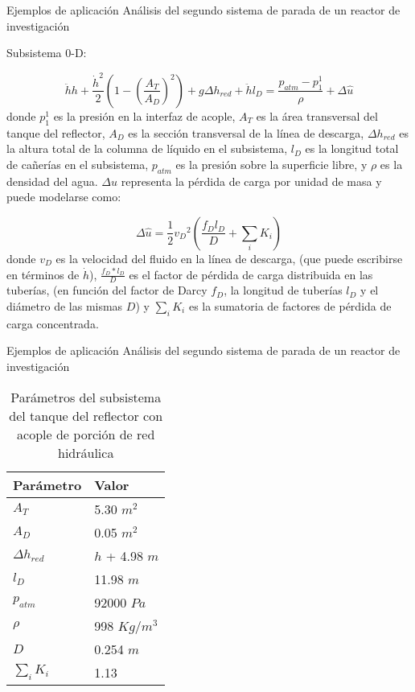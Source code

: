\footnotesize
\begin{frame}
{Ejemplos de aplicación}
{Análisis del segundo sistema de parada de un reactor de investigación}

Subsistema 0-D:

\begin{equation*}
\ddot{h} h + \frac{\dot{h}^2}{2}\left( 1- \left(\frac{A_T}{A_D} \right)^2 \right) + g \Delta h_{red} + \ddot{h}  l_D = 
\frac{p_{atm}-p_1^1}{\rho} + \Delta \hat{u}
\label{eq-tanque}
\end{equation*}
donde $p_1^1$ es la presión en la interfaz de acople,
$A_T$ es la área transversal del tanque del reflector, 
$A_D$ es la sección transversal de la línea de descarga,
$\Delta h_{red}$ es la altura total de la columna de líquido en el subsistema,
$l_D$ es la longitud total de cañerías en el subsistema,
$p_{atm}$ es la presión sobre la superficie libre,
y $\rho$ es la densidad del agua.
$\Delta \hat{u}$ representa la pérdida de carga por unidad de masa y puede modelarse como:

\begin{equation*}
\Delta \hat{u} = \frac {1} {2} {v_D}^2 \left( \frac {f_D l_D}{D} + \sum_i K_i \right)
\end{equation*}
donde $v_D$ es la velocidad del fluido en la línea de descarga,
(que puede escribirse en términos de $\dot{h}$),
$\frac {f_D*l_D}{D}$ es el factor de pérdida de carga distribuida en las tuberías,
(en función del factor de Darcy $f_D$, la longitud de tuberías $l_D$ y el diámetro de las mismas $D$)
y $\sum_i K_i$ es la sumatoria de factores de pérdida de carga concentrada.

\end{frame}

\normalsize
\begin{frame}
{Ejemplos de aplicación}
{Análisis del segundo sistema de parada de un reactor de investigación}

\begin{table}[]
\centering
\begin{tabular}{|l|l|}
\hline
Parámetro        & Valor          \\ \hline
$A_T$            & 5.30 $m^2$     \\ \hline
$A_D$            & 0.05 $m^2$     \\ \hline
$\Delta h_{red}$ & $h$ + 4.98 $m$ \\ \hline
$l_D$            & 11.98 $m$      \\ \hline
$p_{atm}$        & 92000 $Pa$     \\ \hline
$\rho$           & 998 $Kg/m^3$   \\ \hline
$D$              & 0.254 $m$      \\ \hline
$\sum_i K_i$     & 1.13           \\ \hline
\end{tabular}
\caption{Parámetros del subsistema del tanque del reflector con acople de porción de red hidráulica}
\label{tabla-tanque}
\end{table}

\end{frame}


